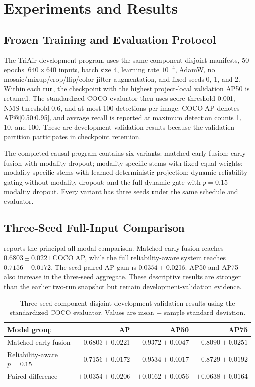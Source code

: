 \section{Experiments and Results}
\subsection{Frozen Training and Evaluation Protocol}
The TriAir development program uses the same component-disjoint manifests, 50 epochs, $640\times640$ inputs, batch size 4, learning rate $10^{-4}$, AdamW, no mosaic/mixup/crop/flip/color-jitter augmentation, and fixed seeds 0, 1, and 2. Within each run, the checkpoint with the highest project-local validation AP50 is retained. The standardized COCO evaluator then uses score threshold 0.001, NMS threshold 0.6, and at most 100 detections per image. COCO AP denotes AP@[0.50:0.95], and average recall is reported at maximum detection counts 1, 10, and 100. These are development-validation results because the validation partition participates in checkpoint retention.

The completed causal program contains six variants: matched early fusion; early fusion with modality dropout; modality-specific stems with fixed equal weights; modality-specific stems with learned deterministic projection; dynamic reliability gating without modality dropout; and the full dynamic gate with $p=0.15$ modality dropout. Every variant has three seeds under the same schedule and evaluator.

\subsection{Three-Seed Full-Input Comparison}
 reports the principal all-modal comparison. Matched early fusion reaches $0.6803\pm0.0221$ COCO AP, while the full reliability-aware system reaches $0.7156\pm0.0172$. The seed-paired AP gain is $0.0354\pm0.0206$. AP50 and AP75 also increase in the three-seed aggregate. These descriptive results are stronger than the earlier two-run snapshot but remain development-validation evidence.

\begin{table}[t]
\centering
\caption{Three-seed component-disjoint development-validation results using the standardized COCO evaluator. Values are mean $\pm$ sample standard deviation.}
\label{tab:core}
\small
\begin{tabular}{@{}lrrr@{}}
\toprule
Model group & AP & AP50 & AP75\\
\midrule
Matched early fusion & $0.6803\pm0.0221$ & $0.9372\pm0.0047$ & $0.8090\pm0.0251$\\
Reliability-aware $p=0.15$ & $\mathbf{0.7156\pm0.0172}$ & $\mathbf{0.9534\pm0.0017}$ & $\mathbf{0.8729\pm0.0192}$\\
Paired difference & $+0.0354\pm0.0206$ & $+0.0162\pm0.0056$ & $+0.0638\pm0.0164$\\
\bottomrule
\end{tabular}
\end{table}

